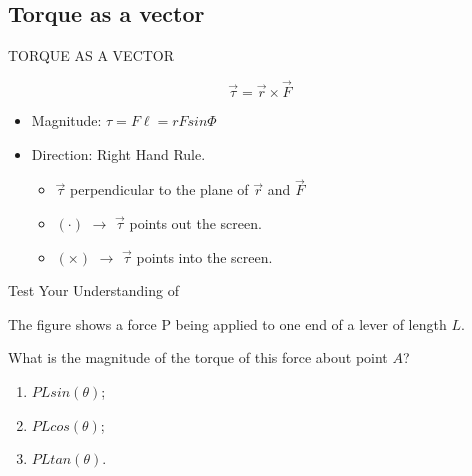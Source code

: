 \documentclass[]{beamer}
\begin{document}
    
    


  \subsection{Torque as a vector}

  \begin{frame}

    TORQUE AS A VECTOR
    
    \vspace{7mm}
 

    \begin{equation}
      \boxed{\vec{\tau}=\vec{r} \times \vec{F}}
    \end{equation}
     
    
    \pause

    \begin{itemize}
      \item Magnitude: $\tau=F\ell=rFsin\Phi$
      \vspace{5mm}
      \item Direction: Right Hand Rule.
      \vspace{5mm}
      \begin{itemize}
        \item $\vec{\tau}$ perpendicular to the plane of $\vec{r}$ and $\vec{F}$
        \item $(\cdot)$ $\rightarrow$ $\vec{\tau}$ points out the screen.
        \item $(\times)$ $\rightarrow$ $\vec{\tau}$ points into the screen.
      \end{itemize}
    \end{itemize}
 
   \end{frame}
     

  
  \begin{frame}


  Test Your Understanding of 
      
  \vspace{7mm}
  
The figure shows a force P being applied to one end of a lever of length $L$. 
\vspace{7mm}


What is the magnitude of the torque of this force about point $A$? 

\begin{enumerate}
  \item $PL sin(\theta)$;
  \item $PL cos (\theta)$;
  \item $PL tan (\theta)$.
\end{enumerate}


\end{frame}
\end{document}
